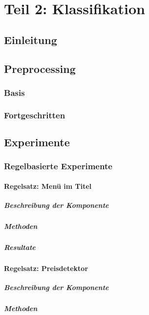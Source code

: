 \chapter{Teil 2: Klassifikation}
\section{Einleitung}
\section{Preprocessing}
\subsection{Basis}
\subsection{Fortgeschritten}
\section{Experimente}
\subsection{Regelbasierte Experimente}
\subsubsection{Regelsatz: Menü im Titel}
\paragraph{Beschreibung der Komponente}
\paragraph{Methoden}
\paragraph{Resultate}
\subsubsection{Regelsatz: Preisdetektor}
\paragraph{Beschreibung der Komponente}
\paragraph{Methoden}
